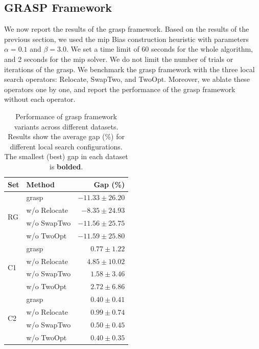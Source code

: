 \documentclass[twocolumn, switch]{article} %
\begin{document}
\subsection{GRASP Framework}

We now report the results of the \gls{grasp} framework. 
Based on the results of the previous section, we used the \gls{mip} Bias construction heuristic with parameters $\alpha = 0.1$ and $\beta = 3.0$.
We set a time limit of 60 seconds for the whole algorithm, and 2 seconds for the \gls{mip} solver.
We do not limit the number of trials or iterations of the \gls{grasp}. 
We benchmark the \gls{grasp} framework with the three local search operators: Relocate, SwapTwo, and TwoOpt.
Moreover, we ablate these operators one by one, and report the performance of the \gls{grasp} framework without each operator.


\begin{table}[h]
    \caption{Performance of \gls{grasp} framework variants across different datasets. Results show the average gap (\%) for different local search configurations. The smallest (best) gap in each dataset is \textbf{bolded}.}
    \label{tab:grasp_performance}
    \centering
    \begin{tabular}{llr}
        \toprule
        \textbf{Set} & \textbf{Method} & \textbf{Gap (\%)} \\
        \midrule
        \multirow[c]{4}{*}{RG} 
            & \gls{grasp} & $-11.33 \pm 26.20$ \\
            & w/o Relocate & $-8.35 \pm 24.93$ \\
            & w/o SwapTwo & $-11.56 \pm 25.75$ \\
            & w/o TwoOpt & $\mathbf{-11.59 \pm 25.80}$ \\
        \midrule
        \multirow[c]{4}{*}{C1} 
            & \gls{grasp} & $\mathbf{0.77 \pm 1.22}$ \\
            & w/o Relocate & $4.85 \pm 10.02$ \\
            & w/o SwapTwo & $1.58 \pm 3.46$ \\
            & w/o TwoOpt & $2.72 \pm 6.86$ \\
        \midrule
        \multirow[c]{4}{*}{C2} 
            & \gls{grasp} & $\mathbf{0.40 \pm 0.41}$ \\
            & w/o Relocate & $0.99 \pm 0.74$ \\
            & w/o SwapTwo & $0.50 \pm 0.45$ \\
            & w/o TwoOpt & $\mathbf{0.40 \pm 0.35}$ \\
        \bottomrule
    \end{tabular}
\end{table}
\end{document}
